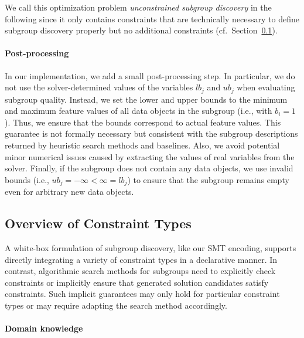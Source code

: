\documentclass{article}
\theoremstyle{definition}
\begin{document}
We call this optimization problem \emph{unconstrained subgroup discovery} in the following since it only contains constraints that are technically necessary to define subgroup discovery properly but no additional constraints (cf.~Section~\ref{sec:csd:approach:constraint-types}).

\paragraph{Post-processing}

In our implementation, we add a small post-processing step.
In particular, we do not use the solver-determined values of the variables $\mathit{lb}_j$ and $\mathit{ub}_j$ when evaluating subgroup quality.
Instead, we set the lower and upper bounds to the minimum and maximum feature values of all data objects in the subgroup (i.e., with $b_i=1$).
Thus, we ensure that the bounds correspond to actual feature values.
This guarantee is not formally necessary but consistent with the subgroup descriptions returned by heuristic search methods and baselines.
Also, we avoid potential minor numerical issues caused by extracting the values of real variables from the solver.
Finally, if the subgroup does not contain any data objects, we use invalid bounds (i.e., $\mathit{ub}_j = -\infty < \infty = \mathit{lb}_j$) to ensure that the subgroup remains empty even for arbitrary new data objects.

\subsection{Overview of Constraint Types}
\label{sec:csd:approach:constraint-types}

A white-box formulation of subgroup discovery, like our SMT encoding, supports directly integrating a variety of constraint types in a declarative manner.
In contrast, algorithmic search methods for subgroups need to explicitly check constraints or implicitly ensure that generated solution candidates satisfy constraints.
Such implicit guarantees may only hold for particular constraint types or may require adapting the search method accordingly.

\paragraph{Domain knowledge}
\end{document}
